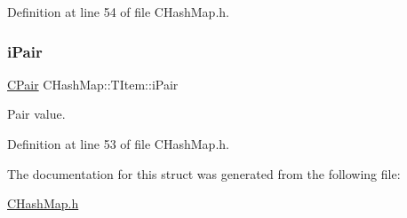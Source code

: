 Definition at line 54 of file C\+Hash\+Map.\+h.

\mbox{\label{struct_c_hash_map_1_1_t_item_a9b832f579f07c1011ef58d89a589470a}} 
\subsubsection{\texorpdfstring{i\+Pair}{iPair}}
{\footnotesize\ttfamily \hyperlink{class_c_pair}{C\+Pair} C\+Hash\+Map\+::\+T\+Item\+::i\+Pair}



Pair value. 



Definition at line 53 of file C\+Hash\+Map.\+h.



The documentation for this struct was generated from the following file\+:\begin{DoxyCompactItemize}
\item 
\hyperlink{_c_hash_map_8h}{C\+Hash\+Map.\+h}\end{DoxyCompactItemize}
